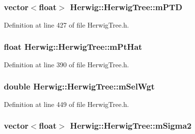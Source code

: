 \subsubsection[{\texorpdfstring{m\+P\+TD}{mPTD}}]{\setlength{\rightskip}{0pt plus 5cm}vector$<$float$>$ Herwig\+::\+Herwig\+Tree\+::m\+P\+TD\hspace{0.3cm}{\ttfamily [protected]}}\hypertarget{class_herwig_1_1_herwig_tree_a7b7332a3ca42994d5f044a8edeadeeb2}{}\label{class_herwig_1_1_herwig_tree_a7b7332a3ca42994d5f044a8edeadeeb2}


Definition at line 427 of file Herwig\+Tree.\+h.

\subsubsection[{\texorpdfstring{m\+Pt\+Hat}{mPtHat}}]{\setlength{\rightskip}{0pt plus 5cm}float Herwig\+::\+Herwig\+Tree\+::m\+Pt\+Hat\hspace{0.3cm}{\ttfamily [protected]}}\hypertarget{class_herwig_1_1_herwig_tree_ab7d94d7d284990f8512a285a578bb0e5}{}\label{class_herwig_1_1_herwig_tree_ab7d94d7d284990f8512a285a578bb0e5}


Definition at line 390 of file Herwig\+Tree.\+h.

\subsubsection[{\texorpdfstring{m\+Sel\+Wgt}{mSelWgt}}]{\setlength{\rightskip}{0pt plus 5cm}double Herwig\+::\+Herwig\+Tree\+::m\+Sel\+Wgt\hspace{0.3cm}{\ttfamily [protected]}}\hypertarget{class_herwig_1_1_herwig_tree_a2d1cb6fc4a481866ede3796640f05e87}{}\label{class_herwig_1_1_herwig_tree_a2d1cb6fc4a481866ede3796640f05e87}


Definition at line 449 of file Herwig\+Tree.\+h.

\subsubsection[{\texorpdfstring{m\+Sigma2}{mSigma2}}]{\setlength{\rightskip}{0pt plus 5cm}vector$<$float$>$ Herwig\+::\+Herwig\+Tree\+::m\+Sigma2\hspace{0.3cm}{\ttfamily [protected]}}\hypertarget{class_herwig_1_1_herwig_tree_ae4570b94630f03dedd19fd68494b6a71}{}\label{class_herwig_1_1_herwig_tree_ae4570b94630f03dedd19fd68494b6a71}


